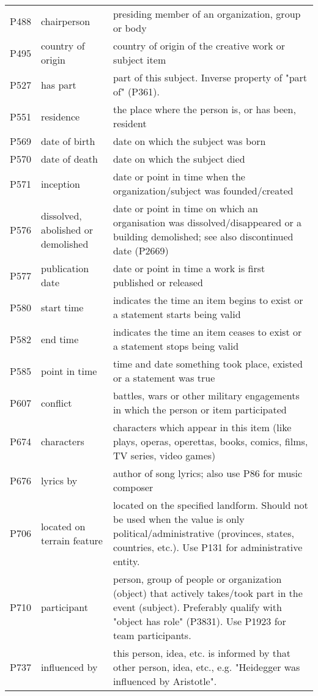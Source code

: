 \documentclass[11pt,a4paper]{article}
\begin{document}
\begin{table*}[thp!]
{\begin{tabular}{p{} | p{} | p{}}
P488 & chairperson & presiding member of an organization, group or body \\
P495 & country of origin & country of origin of the creative work or subject item \\
P527 & has part & part of this subject. Inverse property of "part of" (P361). \\
P551 & residence & the place where the person is, or has been, resident \\
P569 & date of birth & date on which the subject was born \\
P570 & date of death & date on which the subject died \\
P571 & inception & date or point in time when the organization/subject was founded/created \\
P576 & dissolved, abolished or demolished & date or point in time on which an organisation was dissolved/disappeared or a building demolished; see also discontinued date (P2669) \\
P577 & publication date & date or point in time a work is first published or released \\
P580 & start time & indicates the time an item begins to exist or a statement starts being valid \\
P582 & end time & indicates the time an item ceases to exist or a statement stops being valid \\
P585 & point in time & time and date something took place, existed or a statement was true \\
P607 & conflict & battles, wars or other military engagements in which the person or item participated \\
P674 & characters & characters which appear in this item (like plays, operas, operettas, books, comics, films, TV series, video games) \\
P676 & lyrics by & author of song lyrics; also use P86 for music composer \\
P706 & located on terrain feature & located on the specified landform. Should not be used when the value is only political/administrative (provinces, states, countries, etc.). Use P131 for administrative entity. \\
P710 & participant & person, group of people or organization (object) that actively takes/took part in the event (subject).  Preferably qualify with "object has role" (P3831). Use P1923 for team participants. \\
P737 & influenced by & this person, idea, etc. is informed by that other person, idea, etc., e.g. "Heidegger was influenced by Aristotle". \\

\end{tabular}}
\end{table*}
\end{document}
